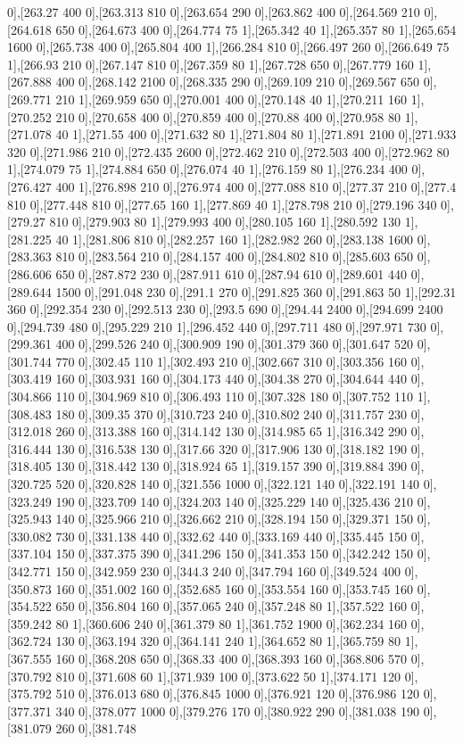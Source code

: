 {0],[263.27 400 0],[263.313 810 0],[263.654 290 0],[263.862 400 0],[264.569 210 0],[264.618 650 0],[264.673 400 0],[264.774 75 1],[265.342 40 1],[265.357 80 1],[265.654 1600 0],[265.738 400 0],[265.804 400 1],[266.284 810 0],[266.497 260 0],[266.649 75 1],[266.93 210 0],[267.147 810 0],[267.359 80 1],[267.728 650 0],[267.779 160 1],[267.888 400 0],[268.142 2100 0],[268.335 290 0],[269.109 210 0],[269.567 650 0],[269.771 210 1],[269.959 650 0],[270.001 400 0],[270.148 40 1],[270.211 160 1],[270.252 210 0],[270.658 400 0],[270.859 400 0],[270.88 400 0],[270.958 80 1],[271.078 40 1],[271.55 400 0],[271.632 80 1],[271.804 80 1],[271.891 2100 0],[271.933 320 0],[271.986 210 0],[272.435 2600 0],[272.462 210 0],[272.503 400 0],[272.962 80 1],[274.079 75 1],[274.884 650 0],[276.074 40 1],[276.159 80 1],[276.234 400 0],[276.427 400 1],[276.898 210 0],[276.974 400 0],[277.088 810 0],[277.37 210 0],[277.4 810 0],[277.448 810 0],[277.65 160 1],[277.869 40 1],[278.798 210 0],[279.196 340 0],[279.27 810 0],[279.903 80 1],[279.993 400 0],[280.105 160 1],[280.592 130 1],[281.225 40 1],[281.806 810 0],[282.257 160 1],[282.982 260 0],[283.138 1600 0],[283.363 810 0],[283.564 210 0],[284.157 400 0],[284.802 810 0],[285.603 650 0],[286.606 650 0],[287.872 230 0],[287.911 610 0],[287.94 610 0],[289.601 440 0],[289.644 1500 0],[291.048 230 0],[291.1 270 0],[291.825 360 0],[291.863 50 1],[292.31 360 0],[292.354 230 0],[292.513 230 0],[293.5 690 0],[294.44 2400 0],[294.699 2400 0],[294.739 480 0],[295.229 210 1],[296.452 440 0],[297.711 480 0],[297.971 730 0],[299.361 400 0],[299.526 240 0],[300.909 190 0],[301.379 360 0],[301.647 520 0],[301.744 770 0],[302.45 110 1],[302.493 210 0],[302.667 310 0],[303.356 160 0],[303.419 160 0],[303.931 160 0],[304.173 440 0],[304.38 270 0],[304.644 440 0],[304.866 110 0],[304.969 810 0],[306.493 110 0],[307.328 180 0],[307.752 110 1],[308.483 180 0],[309.35 370 0],[310.723 240 0],[310.802 240 0],[311.757 230 0],[312.018 260 0],[313.388 160 0],[314.142 130 0],[314.985 65 1],[316.342 290 0],[316.444 130 0],[316.538 130 0],[317.66 320 0],[317.906 130 0],[318.182 190 0],[318.405 130 0],[318.442 130 0],[318.924 65 1],[319.157 390 0],[319.884 390 0],[320.725 520 0],[320.828 140 0],[321.556 1000 0],[322.121 140 0],[322.191 140 0],[323.249 190 0],[323.709 140 0],[324.203 140 0],[325.229 140 0],[325.436 210 0],[325.943 140 0],[325.966 210 0],[326.662 210 0],[328.194 150 0],[329.371 150 0],[330.082 730 0],[331.138 440 0],[332.62 440 0],[333.169 440 0],[335.445 150 0],[337.104 150 0],[337.375 390 0],[341.296 150 0],[341.353 150 0],[342.242 150 0],[342.771 150 0],[342.959 230 0],[344.3 240 0],[347.794 160 0],[349.524 400 0],[350.873 160 0],[351.002 160 0],[352.685 160 0],[353.554 160 0],[353.745 160 0],[354.522 650 0],[356.804 160 0],[357.065 240 0],[357.248 80 1],[357.522 160 0],[359.242 80 1],[360.606 240 0],[361.379 80 1],[361.752 1900 0],[362.234 160 0],[362.724 130 0],[363.194 320 0],[364.141 240 1],[364.652 80 1],[365.759 80 1],[367.555 160 0],[368.208 650 0],[368.33 400 0],[368.393 160 0],[368.806 570 0],[370.792 810 0],[371.608 60 1],[371.939 100 0],[373.622 50 1],[374.171 120 0],[375.792 510 0],[376.013 680 0],[376.845 1000 0],[376.921 120 0],[376.986 120 0],[377.371 340 0],[378.077 1000 0],[379.276 170 0],[380.922 290 0],[381.038 190 0],[381.079 260 0],[381.748 }

